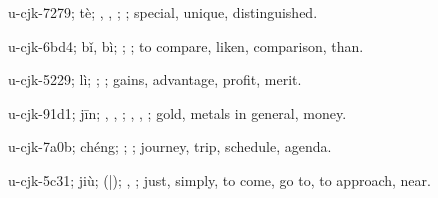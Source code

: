 \begin{multicols}{2}
{\cjkgGlue{}u-cjk-7279; tè; \cjkgGlue{}, \cjkgGlue{}, \cjkgGlue{}; \cjkgGlue{}; special, unique, distinguished.

\cjkgGlue{}u-cjk-6bd4; bǐ, bì; \cjkgGlue{}\cjkgGlue{}\cjkgGlue{}; \cjkgGlue{}; to compare, liken, comparison, than.

\cjkgGlue{}u-cjk-5229; lì; \cjkgGlue{}\cjkgGlue{}\cjkgGlue{}; \cjkgGlue{}; gains, advantage, profit, merit.

\cjkgGlue{}u-cjk-91d1; jīn; \cjkgGlue{}, \cjkgGlue{}, \cjkgGlue{}; \cjkgGlue{}, \cjkgGlue{}, \cjkgGlue{}; gold, metals in general, money.

\cjkgGlue{}u-cjk-7a0b; chéng; \cjkgGlue{}; \cjkgGlue{}; journey, trip, schedule, agenda.

\cjkgGlue{}u-cjk-5c31; jiù; \cjkgGlue{}\cjkgGlue{}(\cjkgGlue{}|\cjkgGlue{}); \cjkgGlue{}, \cjkgGlue{}; just, simply, to come, go to, to approach, near.

}
\end{multicols}
